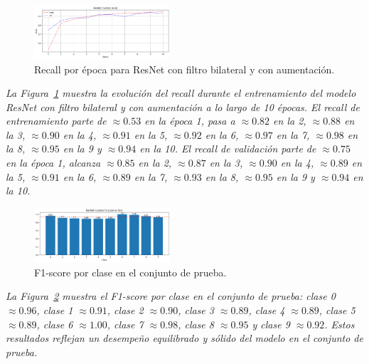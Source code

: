 \documentclass[conference]{IEEEtran}
\begin{document}
\begin{figure}[H]
    \centering
    \includegraphics[width=0.45\textwidth]{graphics-resnet-bilateral/resnet_bilateral_with_recall.png}
    \caption{Recall por época para ResNet con filtro bilateral y con aumentación.}
    \label{fig:resnet_bilateral_with_recall}
\end{figure}
\noindent\textit{%
La Figura~\ref{fig:resnet_bilateral_with_recall} muestra la evolución del recall durante el entrenamiento del modelo ResNet con filtro bilateral y con aumentación a lo largo de 10 épocas. El recall de entrenamiento parte de \(\approx0.53\) en la época 1, pasa a \(\approx0.82\) en la 2, \(\approx0.88\) en la 3, \(\approx0.90\) en la 4, \(\approx0.91\) en la 5, \(\approx0.92\) en la 6, \(\approx0.97\) en la 7, \(\approx0.98\) en la 8, \(\approx0.95\) en la 9 y \(\approx0.94\) en la 10. El recall de validación parte de \(\approx0.75\) en la época 1, alcanza \(\approx0.85\) en la 2, \(\approx0.87\) en la 3, \(\approx0.90\) en la 4, \(\approx0.89\) en la 5, \(\approx0.91\) en la 6, \(\approx0.89\) en la 7, \(\approx0.93\) en la 8, \(\approx0.95\) en la 9 y \(\approx0.94\) en la 10.%
}

\begin{figure}[H]
    \centering
    \includegraphics[width=0.45\textwidth]{graphics-resnet-bilateral/resnet_bilateral_with_class_f1.png}
    \caption{F1-score por clase en el conjunto de prueba.}
    \label{fig:resnet_bilateral_with_class_f1}
\end{figure}
\noindent\textit{%
La Figura~\ref{fig:resnet_bilateral_with_class_f1} muestra el F1-score por clase en el conjunto de prueba: clase 0 \(\approx0.96\), clase 1 \(\approx0.91\), clase 2 \(\approx0.90\), clase 3 \(\approx0.89\), clase 4 \(\approx0.89\), clase 5 \(\approx0.89\), clase 6 \(\approx1.00\), clase 7 \(\approx0.98\), clase 8 \(\approx0.95\) y clase 9 \(\approx0.92\). Estos resultados reflejan un desempeño equilibrado y sólido del modelo en el conjunto de prueba.%
}
\end{document}
